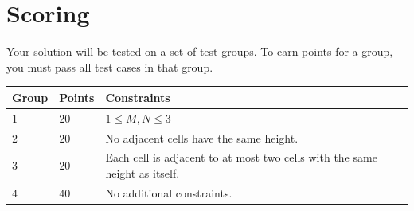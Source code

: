\section*{Scoring}
Your solution will be tested on a set of test groups.
To earn points for a group, you must pass all test cases in that group.

\noindent
\begin{tabular}{| l | l | l |}
  \hline
  \textbf{Group} & \textbf{Points} & \textbf{Constraints} \\ \hline
  $1$    & $20$        &  $1 \leq M, N \leq 3$\\ \hline
  $2$    & $20$        &  No adjacent cells have the same height. \\ \hline
  $3$    & $20$        &  Each cell is adjacent to at most two cells with the same height as itself. \\ \hline
  $4$    & $40$        &  No additional constraints. \\ \hline
\end{tabular}
